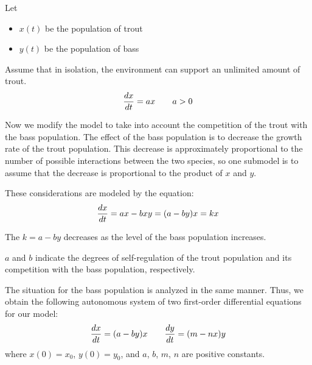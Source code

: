   \par Let
    \begin{itemize}
      \item $x(t)$ be the population of trout
      \item $y(t)$ be the population of bass
    \end{itemize}
  \par Assume that in isolation, the environment can support an unlimited amount of trout.
  \[
    \dfrac{d x}{d t} = ax \qquad a > 0
  \]
  \par Now we modify the model to take into account the competition of
  the trout with the bass population.  The effect of the bass population is to decrease the growth rate of the trout population. This decrease is approximately proportional to the number of possible interactions between the two species, so one submodel is to assume that the decrease is proportional to the product of $x$ and $y$.
  \par These considerations are modeled by the equation:
    \[
      \dfrac{d x}{d t} = ax - bxy = (a - by)x = kx
    \]
  \par The  $k = a - by$  decreases as the level of the bass population increases.
  \par $a$ and $b$ indicate the degrees of self-regulation of the trout population and its  competition with the bass population, respectively.
  \par The situation for the bass population is analyzed in the same manner. Thus, we obtain
  the following autonomous system of two first-order differential equations for our model:
    \[
      \dfrac{d x}{d t} = (a - by)x \qquad \dfrac{d y}{d t} = (m - nx)y
    \]
    where $x(0) = x_0$, $y(0) = y_0$, and $a$, $b$, $m$, $n$ are positive constants.

